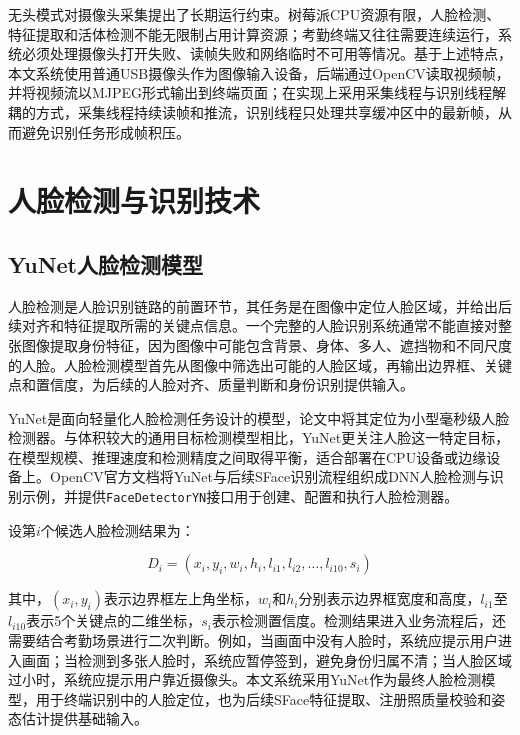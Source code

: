 无头模式对摄像头采集提出了长期运行约束。树莓派CPU资源有限，人脸检测、特征提取和活体检测不能无限制占用计算资源；考勤终端又往往需要连续运行，系统必须处理摄像头打开失败、读帧失败和网络临时不可用等情况。基于上述特点，本文系统使用普通USB摄像头作为图像输入设备，后端通过OpenCV读取视频帧，并将视频流以MJPEG形式输出到终端页面；在实现上采用采集线程与识别线程解耦的方式，采集线程持续读帧和推流，识别线程只处理共享缓冲区中的最新帧，从而避免识别任务形成帧积压。

\section{人脸检测与识别技术}

\subsection{YuNet人脸检测模型}

人脸检测是人脸识别链路的前置环节，其任务是在图像中定位人脸区域，并给出后续对齐和特征提取所需的关键点信息。一个完整的人脸识别系统通常不能直接对整张图像提取身份特征，因为图像中可能包含背景、身体、多人、遮挡物和不同尺度的人脸。人脸检测模型首先从图像中筛选出可能的人脸区域，再输出边界框、关键点和置信度，为后续的人脸对齐、质量判断和身份识别提供输入。

YuNet是面向轻量化人脸检测任务设计的模型，论文中将其定位为小型毫秒级人脸检测器\cite{wu2023yunet}。与体积较大的通用目标检测模型相比，YuNet更关注人脸这一特定目标，在模型规模、推理速度和检测精度之间取得平衡，适合部署在CPU设备或边缘设备上。OpenCV官方文档将YuNet与后续SFace识别流程组织成DNN人脸检测与识别示例\cite{opencv_dnn_face}，并提供\texttt{FaceDetectorYN}接口用于创建、配置和执行人脸检测器\cite{opencv_facedetectoryn}。

设第$i$个候选人脸检测结果为：

\begin{equation}
    D_i = (x_i, y_i, w_i, h_i, l_{i1}, l_{i2}, \dots, l_{i10}, s_i)
\end{equation}

其中，$(x_i, y_i)$表示边界框左上角坐标，$w_i$和$h_i$分别表示边界框宽度和高度，$l_{i1}$至$l_{i10}$表示5个关键点的二维坐标，$s_i$表示检测置信度。检测结果进入业务流程后，还需要结合考勤场景进行二次判断。例如，当画面中没有人脸时，系统应提示用户进入画面；当检测到多张人脸时，系统应暂停签到，避免身份归属不清；当人脸区域过小时，系统应提示用户靠近摄像头。本文系统采用YuNet作为最终人脸检测模型，用于终端识别中的人脸定位，也为后续SFace特征提取、注册照质量校验和姿态估计提供基础输入。

